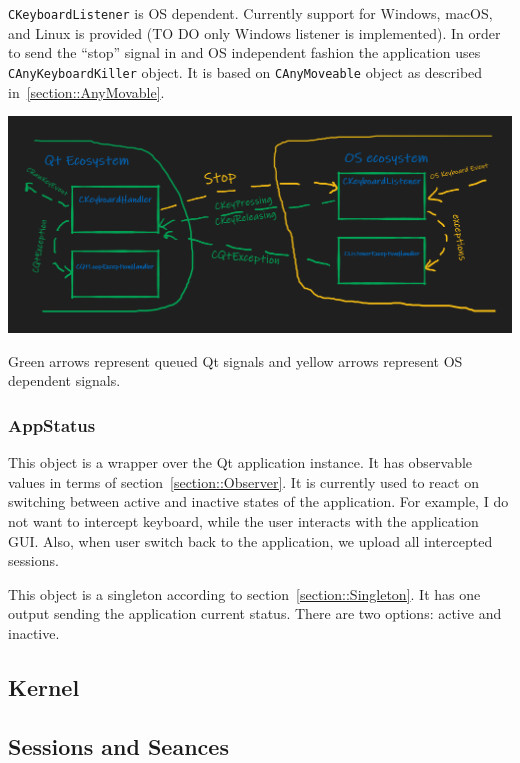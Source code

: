 \documentclass{article}
\begin{document}
\verb"CKeyboardListener" is OS dependent. Currently support for Windows, macOS, and Linux is provided (TO DO only Windows listener is implemented). In order to send the ``stop'' signal in and OS independent fashion the application uses \verb"CAnyKeyboardKiller" object. It is based on \verb"CAnyMoveable" object as described in~\ref{section::AnyMovable}.

\begin{center}
\includegraphics[scale = 0.5]{Figures/KeyboardInterception.png}

Green arrows represent queued Qt signals and yellow arrows represent OS dependent signals.
\end{center}

\subsubsection{AppStatus}

This object is a wrapper over the Qt application instance. It has observable values in terms of section~\ref{section::Observer}. It is currently used to react on switching between active and inactive states of the application. For example, I do not want to intercept keyboard, while the user interacts with the application GUI. Also, when user switch back to the application, we upload all intercepted sessions.


This object is a singleton according to section~\ref{section::Singleton}. It has one output sending the application current status. There are two options: active and inactive.

\subsection{Kernel}


\subsection{Sessions and Seances}
\end{document}
